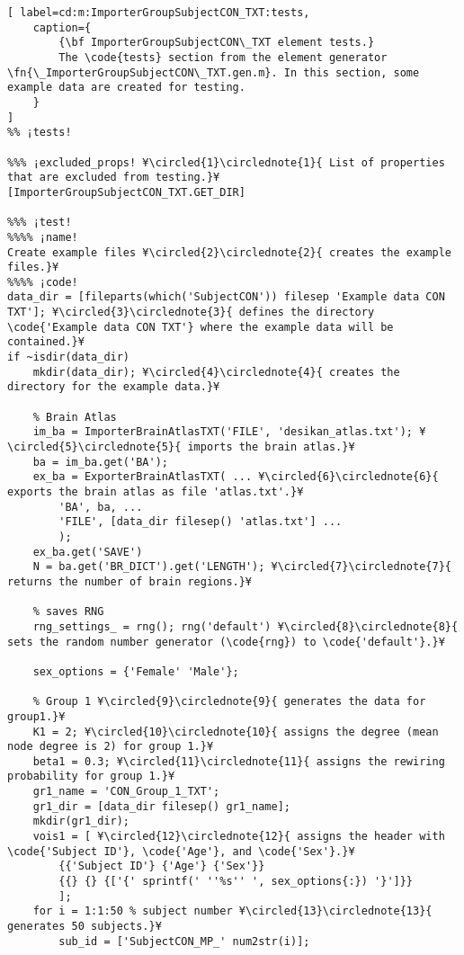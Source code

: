 \documentclass{tufte-handout}
\begin{document}
\begin{lstlisting}[	label=cd:m:ImporterGroupSubjectCON_TXT:tests,
	caption={
		{\bf ImporterGroupSubjectCON\_TXT element tests.}
		The \code{tests} section from the element generator \fn{\_ImporterGroupSubjectCON\_TXT.gen.m}. In this section, some example data are created for testing.
	}
]
%% ¡tests!

%%% ¡excluded_props! ¥\circled{1}\circlednote{1}{ List of properties that are excluded from testing.}¥
[ImporterGroupSubjectCON_TXT.GET_DIR]

%%% ¡test!
%%%% ¡name!
Create example files ¥\circled{2}\circlednote{2}{ creates the example files.}¥
%%%% ¡code!
data_dir = [fileparts(which('SubjectCON')) filesep 'Example data CON TXT']; ¥\circled{3}\circlednote{3}{ defines the directory \code{'Example data CON TXT'} where the example data will be contained.}¥
if ~isdir(data_dir)
    mkdir(data_dir); ¥\circled{4}\circlednote{4}{ creates the directory for the example data.}¥

    % Brain Atlas
    im_ba = ImporterBrainAtlasTXT('FILE', 'desikan_atlas.txt'); ¥\circled{5}\circlednote{5}{ imports the brain atlas.}¥
    ba = im_ba.get('BA');
    ex_ba = ExporterBrainAtlasTXT( ... ¥\circled{6}\circlednote{6}{ exports the brain atlas as file 'atlas.txt'.}¥
        'BA', ba, ...
        'FILE', [data_dir filesep() 'atlas.txt'] ...
        );
    ex_ba.get('SAVE')
    N = ba.get('BR_DICT').get('LENGTH'); ¥\circled{7}\circlednote{7}{ returns the number of brain regions.}¥

    % saves RNG
    rng_settings_ = rng(); rng('default') ¥\circled{8}\circlednote{8}{ sets the random number generator (\code{rng}) to \code{'default'}.}¥

    sex_options = {'Female' 'Male'};

    % Group 1 ¥\circled{9}\circlednote{9}{ generates the data for group1.}¥
    K1 = 2; ¥\circled{10}\circlednote{10}{ assigns the degree (mean node degree is 2) for group 1.}¥
    beta1 = 0.3; ¥\circled{11}\circlednote{11}{ assigns the rewiring probability for group 1.}¥
    gr1_name = 'CON_Group_1_TXT';
    gr1_dir = [data_dir filesep() gr1_name];
    mkdir(gr1_dir);
    vois1 = [ ¥\circled{12}\circlednote{12}{ assigns the header with \code{'Subject ID'}, \code{'Age'}, and \code{'Sex'}.}¥
        {{'Subject ID'} {'Age'} {'Sex'}}
        {{} {} {['{' sprintf(' ''%s'' ', sex_options{:}) '}']}}
        ];
    for i = 1:1:50 % subject number ¥\circled{13}\circlednote{13}{ generates 50 subjects.}¥
        sub_id = ['SubjectCON_MP_' num2str(i)];


\end{lstlisting}
\end{document}
